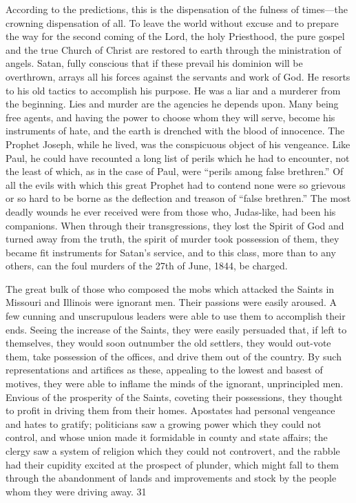 According to the predictions, this is the dispensation of the fulness of times—the crowning
dispensation of all. To leave the world without excuse and to prepare the way for the second
coming of the Lord, the holy Priesthood, the pure gospel and the true Church of Christ are
restored to earth through the ministration of angels. Satan, fully conscious that if these
prevail his dominion will be overthrown, arrays all his forces against the servants and work
of God. He resorts to his old tactics to accomplish his purpose. He was a liar and a murderer
from the beginning. Lies and murder are the agencies he depends upon. Many being free
agents, and having the power to choose whom they will serve, become his instruments of
hate, and the earth is drenched with the blood of innocence. The Prophet Joseph, while he
lived, was the conspicuous object of his vengeance. Like Paul, he could have recounted a
long list of perils which he had to encounter, not the least of which, as in the case of Paul,
were ``perils among false brethren.'' Of all the evils with which this great Prophet had to
contend none were so grievous or so hard to be borne as the deflection and treason of ``false
brethren.'' The most deadly wounds he ever received were from those who, Judas-like, had
been his companions. When through their transgressions, they lost the Spirit of God and
turned away from the truth, the spirit of murder took possession of them, they became fit
instruments for Satan's service, and to this class, more than to any others, can the foul
murders of the 27th of June, 1844, be charged.

The great bulk of those who composed the mobs which attacked the Saints in Missouri and
Illinois were ignorant men. Their passions were easily aroused. A few cunning and
unscrupulous leaders were able to use them to accomplish their ends. Seeing the increase of
the Saints, they were easily persuaded that, if left to themselves, they would soon outnumber
the old settlers, they would out-vote them, take possession of the offices, and drive them out
of the country. By such representations and artifices as these, appealing to the lowest and
basest of motives, they were able to inflame the minds of the ignorant, unprincipled men.
Envious of the prosperity of the Saints, coveting their possessions, they thought to profit in
driving them from their homes. Apostates had personal vengeance and hates to gratify;
politicians saw a growing power which they could not control, and whose union made it
formidable in county and state affairs; the clergy saw a system of religion which they could
not controvert, and the rabble had their cupidity excited at the prospect of plunder, which
might fall to them through the abandonment of lands and improvements and stock by the
people whom they were driving away. 31

